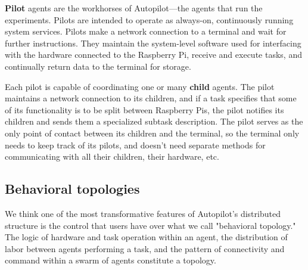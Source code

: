 \textbf{Pilot} agents are the workhorses of Autopilot---the agents that run the experiments. Pilots are intended to operate as always-on, continuously running system services. Pilots make a network connection to a terminal and wait for further instructions. They maintain the system-level software used for interfacing with the hardware connected to the Raspberry Pi, receive and execute tasks, and continually return data to the terminal for storage. 

Each pilot is capable of coordinating one or many \textbf{child} agents. The pilot maintains a network connection to its children, and if a task specifies that some of its functionality is to be split between Raspberry Pis, the pilot notifies its children and sends them a specialized subtask description. The pilot serves as the only point of contact between its children and the terminal, so the terminal only needs to keep track of its pilots, and doesn't need separate methods for communicating with all their children, their hardware, etc.

\subsection{Behavioral topologies}
\label{sec:topology}

We think one of the most transformative features of Autopilot's distributed structure is the control that users have over what we call "behavioral topology." The logic of hardware and task operation within an agent, the distribution of labor between agents performing a task, and the pattern of connectivity and command within a swarm of agents constitute a topology. 

